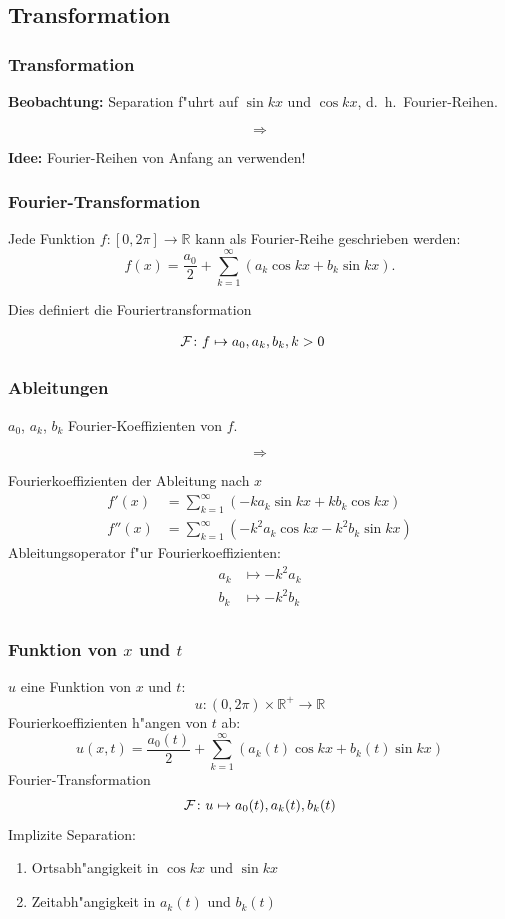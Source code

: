\documentclass{beamer}
\begin{document}
\begin{frame}
\section{Transformation}
\frametitle{Transformation}

{\bf Beobachtung:} Separation f"uhrt auf $\sin kx$ und $\cos kx$,
d.~h.~Fourier-Reihen.

\[
\Rightarrow
\]
\bigskip

{\bf Idee:} Fourier-Reihen von Anfang an verwenden!

\end{frame}

\begin{frame}
\frametitle{Fourier-Transformation}

Jede Funktion $f\colon [0,2\pi]\to\mathbb R$ kann als Fourier-Reihe
geschrieben werden:
\[
f(x)=\frac{a_0}{2}+\sum_{k=1}^\infty(a_k\cos kx+b_k\sin kx).
\]

\medskip
\pause
Dies definiert die Fouriertransformation
\medskip

\begin{align*}
{\cal F}\colon
f
&\mapsto
a_0, a_k, b_k, k> 0
\end{align*}

\end{frame}

\begin{frame}
\frametitle{Ableitungen}
$a_0$, $a_k$, $b_k$ Fourier-Koeffizienten von $f$.

\[\Rightarrow\]

Fourierkoeffizienten der Ableitung nach $x$
\begin{align*}
f'(x)&=\sum_{k=1}^\infty (-ka_k\sin kx+kb_k\cos kx)\\
f''(x)&=\sum_{k=1}^\infty (-k^2a_k\cos kx-k^2b_k\sin kx)
\end{align*}
Ableitungsoperator f"ur Fourierkoeffizienten:
\begin{align*}
a_k&\mapsto -k^2a_k\\
b_k&\mapsto -k^2b_k\\
\end{align*}
\end{frame}

\begin{frame}
\frametitle{Funktion von $x$ und $t$}

$u$ eine Funktion von $x$ und $t$:
\[
u\colon (0,2\pi)\times \mathbb R^+\to \mathbb R
\]
Fourierkoeffizienten h"angen von $t$ ab:
\[
u(x,t)=\frac{a_0(t)}2+\sum_{k=1}^\infty (a_k(t)\cos kx+b_k(t)\sin kx)
\]
Fourier-Transformation
\[
{\cal F}\colon
u\mapsto
a_0(t), a_k(t), b_k(t)
\]
\pause
Implizite Separation:
\begin{enumerate}[<+->]
\item Ortsabh"angigkeit in $\cos kx$ und $\sin kx$
\item Zeitabh"angigkeit in $a_k(t)$ und $b_k(t)$
\end{enumerate}

\end{frame}
\end{document}
